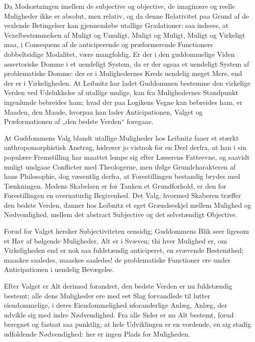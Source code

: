 \documentclass[12pt]{book}
\newcommand{\opage}[1]{\marginnote{\footnotesize\textit{[#1]}}}
\begin{document}
Da Modsætningen imellem de subjective og objective,
de imaginære og reelle Muligheder ikke er absolut, men relativ,
og da denne Relativitet paa Grund af de vexlende Betingelser
kan gjennemløbe utallige Gradationer: saa indsees, at Vexelbestemmelsen
af Muligt og Umuligt, Muligt og Muligt,
Muligt og Virkeligt maa, i Consequens af de anticiperende
og præformerende Functioners dobbeltsidige Modalitet, være
mangfoldig. Er der i den guddommelige Viden assertoriske
Domme i et uendeligt System, da er der ogsaa et uendeligt
System af problematiske Domme: der er i Mulighedernes
Kreds uendelig meget Mere, end der er i Virkeligheden. At
Leibnitz har ladet Guddommen bestemme den virkelige Verden
ved Udelukkelse af utallige mulige, kan fra Mulighedernes
Standpunkt ingenlunde bebreides ham; hvad der paa Logikens
Vegne kan bebreides ham, er Maaden, den Maade, hvorpaa
\opage{246}han lader Anticipationen, Valget og Præformationen af „den
bedste Verden“ foregaae.

At Guddommens Valg blandt utallige Muligheder hos
Leibnitz faaer et stærkt anthropomorphistisk Anstrøg, hidrører
jo vistnok for en Deel derfra, at han i sin populære Fremstilling
har maattet lempe sig efter Læserens Fatteevne, og
saavidt muligt undgaae Conflicter med Theologerne, men
ifølge Grundcharakteren af hans Philosophie, dog væsentlig
derfra, at Forestillingen bestandig brydes med Tænkningen.
Medens Skabelsen er for Tanken et Grundforhold, er den
for Forestillingen en overnaturlig Begivenhed. Det Valg,
hvormed Skaberen træffer den bedste Verden, danner hos
Leibnitz et eget Grændseskjel mellem Mulighed og Nødvendighed,
mellem det abstract Subjective og det selvstændigt Objective.

Forud for Valget hersker Subjectiviteten eensidig; Guddommens
Blik seer ligesom et Hav af bølgende Muligheder,
Alt er i Svæven; thi hver Mulighed er, om Virkeligheden
end er nok saa fuldstændig anticiperet, en svævende Bestemthed;
maaskee saaledes, maaskee saaledes! de problematiske
Functioner ere under Anticipationen i uendelig Bevægelse.

Efter Valget er Alt derimod forandret, den bedste Verden
er nu fuldstændig bestemt; alle dens Muligheder ere med eet
Slag forvandlede til lutter eiendommelige, i deres Eiendommelighed
uforanderlige Anlæg, Anlæg, der udvikle sig med indre
Nødvendighed. Fra alle Sider er nu Alt bestemt, forud beregnet
og fastsat saa punktlig, at hele Udviklingen er en vordende, en
sig stadig udfoldende Nødvendighed: her er ingen Plads for
Muligheden.
\end{document}
